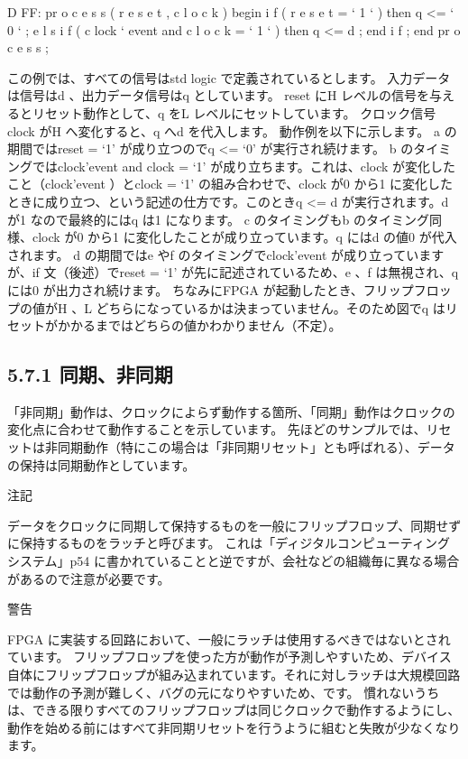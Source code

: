 \documentclass[letterpaper,10pt,dvipdfmx]{sphinxmanual}
\begin{document}
D FF: pr o c e s s ( r e s e t , c l o c k )
begin
i f ( r e s e t = ` 1 ` ) then
q \textless{}= ` 0 ` ;
e l s i f ( c lock ` event and c l o c k = ` 1 ` ) then
q \textless{}= d ;
end i f ;
end pr o c e s s ;

この例では、すべての信号はstd logic で定義されているとします。
入力データは信号はd 、出力データ信号はq としています。
reset にH レベルの信号を与えるとリセット動作として、q をL レベルにセットしています。
クロック信号clock がH へ変化すると、q へd を代入します。
動作例を以下に示します。
a の期間ではreset = `1' が成り立つのでq \textless{}= `0' が実行され続けます。
b のタイミングではclock'event and clock = `1' が成り立ちます。これは、clock が変化したこと（clock'event ）とclock = `1' の組み合わせで、clock が0 から1 に変化したときに成り立つ、という記述の仕方です。このときq \textless{}= d が実行されます。d が1 なので最終的にはq は1 になります。
c のタイミングもb のタイミング同様、clock が0 から1 に変化したことが成り立っています。q にはd の値0 が代入されます。
d の期間ではe やf のタイミングでclock'event が成り立っていますが、if 文（後述）でreset = `1' が先に記述されているため、e 、f は無視され、q には0 が出力され続けます。
ちなみにFPGA が起動したとき、フリップフロップの値がH 、L どちらになっているかは決まっていません。そのため図でq はリセットがかかるまではどちらの値かわかりません（不定）。


\subsection{5.7.1 同期、非同期}
\label{05_try:id9}
「非同期」動作は、クロックによらず動作する箇所、「同期」動作はクロックの変化点に合わせて動作することを示しています。
先ほどのサンプルでは、リセットは非同期動作（特にこの場合は「非同期リセット」とも呼ばれる）、データの保持は同期動作としています。

注記

データをクロックに同期して保持するものを一般にフリップフロップ、同期せずに保持するものをラッチと呼びます。
これは「ディジタルコンピューティングシステム」p54 に書かれていることと逆ですが、会社などの組織毎に異なる場合があるので注意が必要です。

警告

FPGA に実装する回路において、一般にラッチは使用するべきではないとされています。
フリップフロップを使った方が動作が予測しやすいため、デバイス自体にフリップフロップが組み込まれています。それに対しラッチは大規模回路では動作の予測が難しく、バグの元になりやすいため、です。
慣れないうちは、できる限りすべてのフリップフロップは同じクロックで動作するようにし、動作を始める前にはすべて非同期リセットを行うように組むと失敗が少なくなります。
\end{document}
